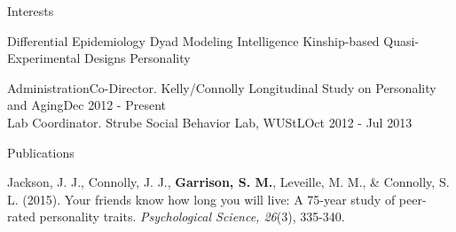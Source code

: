\documentclass {resume}
\newlength{\wideitemsep}
\let\olditem\item
\renewcommand{\item}{\setlength{\itemsep}{\wideitemsep}\olditem}
\newcommand{\bigcdot}{\hspace* {-.8 mm}{\Large$\cdot$}\hspace* {.8 mm}}
\newcommand{\meb}{{\bf Garrison, S. M.}\xspace}
\begin{document}
\begin{rSection}{\textrm{Interests}} \begin{center}Differential Epidemiology \bigcdot Dyad Modeling \bigcdot Intelligence \bigcdot Kinship-based Quasi-Experimental Designs \bigcdot Personality\end{center}
\end{rSection}
\begin{samepage}\begin{rSection}{\textrm{Administration}}Co-Director. Kelly/Connolly Longitudinal Study on Personality and Aging\hfill Dec 2012 - Present\smallskip\\
Lab Coordinator. Strube Social Behavior Lab,  WUStL\hfill Oct 2012 - Jul 2013\end{rSection}\end{samepage}%


\begin{rSection}{\textrm{Publications}}%
\begin{etaremune}\item Jackson, J. J., Connolly, J. J., \meb, Leveille, M. M., \& Connolly, S. L. (2015). Your friends know how long you will live: A 75-year study of peer-rated personality traits. \textit{Psychological Science, 26}(3),  335-340.\\ \href{http://pss.sagepub.com/content/early/2015/01/12/0956797614561800.full}{\color{blue}{doi:10.1177/0956797614561800}}
\end{etaremune}\end{rSection}%
\end{document}
